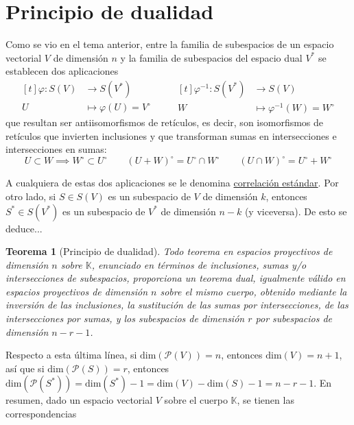 \documentclass[12pt]{report}
\newtheorem{theorem}{Teorema}[chapter]
\theoremstyle{definition}
\theoremstyle{definition}
\theoremstyle{remark}
\begin{document}
\section{Principio de dualidad}
Como se vio en el tema anterior, entre la familia de subespacios de un espacio vectorial $V$ de dimensión $n$ y la familia de subespacios del espacio dual $V^*$ se establecen dos aplicaciones 
\begin{equation*}
\begin{aligned}[t]
\varphi \colon S(V) &\longrightarrow S(V^*) \\
U &\longmapsto \varphi(U) = V^\circ
\end{aligned}
\qquad
\begin{aligned}[t]
\varphi^{-1} \colon S(V^*) &\longrightarrow S(V) \\
W &\longmapsto \varphi^{-1}(W) = W^\circ
\end{aligned}
\end{equation*}
que resultan ser antiisomorfismos de retículos, es decir, son isomorfismos de retículos que invierten inclusiones y que transforman sumas en intersecciones e intersecciones en sumas:
\[U \subset W \implies W^\circ \subset U^\circ \qquad (U+W)^\circ = U^\circ \cap W^\circ \qquad (U \cap W)^\circ = U^\circ + W^\circ\]

A cualquiera de estas dos aplicaciones se le denomina \ul{correlación estándar}. Por otro lado, si $S \in S(V)$ es un subespacio de $V$ de dimensión $k$, entonces $S^* \in S(V^*)$ es un subespacio de $V^*$ de dimensión $n-k$ (y viceversa). De esto se deduce...
\begin{theorem}[Principio de dualidad]
Todo teorema en espacios proyectivos de dimensión $n$ sobre $\mathbb{K}$, enunciado en términos de inclusiones, sumas y/o intersecciones de subespacios, proporciona un teorema dual, igualmente válido en espacios proyectivos de dimensión $n$ sobre el mismo cuerpo, obtenido mediante la inversión de las inclusiones, la sustitución de las sumas por intersecciones, de las intersecciones por sumas, y los subespacios de dimensión $r$ por subespacios de dimensión $n-r-1$.
\end{theorem}

Respecto a esta última línea, si $\mathrm{dim}(\mathcal{P}(V)) =n$, entonces $\mathrm{dim}(V) = n+1$, así que si $\mathrm{dim}(\mathcal{P}(S)) = r$, entonces $\mathrm{dim}(\mathcal{P}(S^*)) = \mathrm{dim}(S^*)-1 = \mathrm{dim}(V) - \mathrm{dim}(S) - 1 = n-r-1$. En resumen, dado un espacio vectorial $V$ sobre el cuerpo $\mathbb{K}$, se tienen las correspondencias
\end{document}
